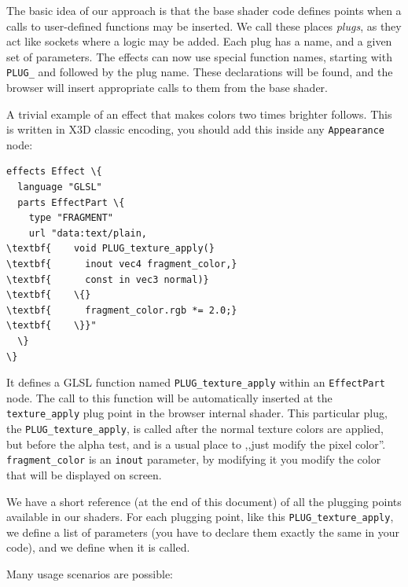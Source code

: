 \documentclass{acmsiggraph}                     %
\begin{document}
The basic idea of our approach is that the base shader code defines
points when a calls to user-defined functions may be inserted. We call
these places \textit{plugs}, as they act like sockets where a logic
may be added. Each plug has a name, and a given set of parameters.
The effects can now use special function names, starting with \texttt{PLUG\_}
and followed by the plug name. These declarations will be found,
and the browser will insert appropriate calls to them from the base shader.

A trivial example of an effect that makes colors two times brighter
follows. This is written in X3D classic encoding,
you should add this inside any \texttt{Appearance} node:

\begin{Verbatim}[commandchars=\\\{\},frame=single]
effects Effect \{
  language "GLSL"
  parts EffectPart \{
    type "FRAGMENT"
    url "data:text/plain,
\textbf{    void PLUG_texture_apply(}
\textbf{      inout vec4 fragment_color,}
\textbf{      const in vec3 normal)}
\textbf{    \{}
\textbf{      fragment_color.rgb *= 2.0;}
\textbf{    \}}"
  \}
\}
\end{Verbatim}

It defines a GLSL function named \texttt{PLUG\_texture\_apply}
within an \texttt{EffectPart} node. The call to this function will
be automatically inserted at the \texttt{texture\_apply} plug point in
the browser internal shader. This particular plug,
the \texttt{PLUG\_texture\_apply}, is called after the normal texture colors
are applied, but before the alpha test, and is a usual place to ,,just modify the pixel color''.
\texttt{fragment\_color} is an \texttt{inout} parameter, by modifying it
you modify the color that will be displayed on screen.

We have a short reference (at the end of this document) of all
the plugging points available in our shaders. For each plugging point,
like this \texttt{PLUG\_texture\_apply}, we define a list of parameters
(you have to declare them exactly the same in your code), and we define
when it is called.

Many usage scenarios are possible:
\end{document}

